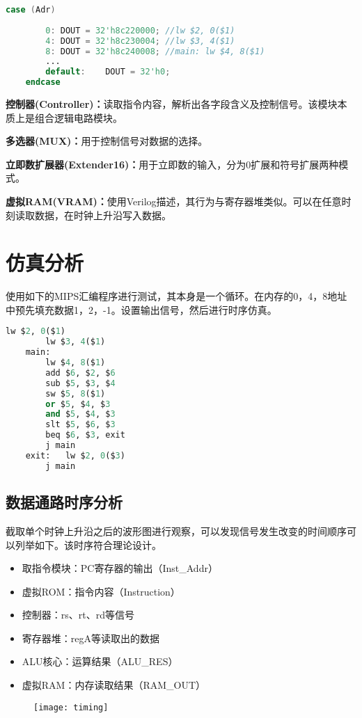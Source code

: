 \documentclass{hfutpaper}
\begin{document}
\begin{lstlisting}[language=verilog]
	case (Adr)
			
		0: DOUT = 32'h8c220000; //lw $2, 0($1)
		4: DOUT = 32'h8c230004; //lw $3, 4($1)
		8: DOUT = 32'h8c240008; //main: lw $4, 8($1)
		...
		default:	DOUT = 32'h0;
	endcase
\end{lstlisting}

\par \textbf{控制器(Controller)：}读取指令内容，解析出各字段含义及控制信号。该模块本质上是组合逻辑电路模块。
\par \textbf{多选器(MUX)：}用于控制信号对数据的选择。
\par \textbf{立即数扩展器(Extender16)：}用于立即数的输入，分为0扩展和符号扩展两种模式。
\par \textbf{虚拟RAM(VRAM)：}使用Verilog描述，其行为与寄存器堆类似。可以在任意时刻读取数据，在时钟上升沿写入数据。

\section{仿真分析}

\par 使用如下的MIPS汇编程序进行测试，其本身是一个循环。在内存的0，4，8地址中预先填充数据1，2，-1。设置输出信号，然后进行时序仿真。


\begin{lstlisting}[language=python]
		lw $2, 0($1)
		lw $3, 4($1)
	main:
		lw $4, 8($1)
		add $6, $2, $6
		sub $5, $3, $4
		sw $5, 8($1)
		or $5, $4, $3
		and $5, $4, $3
		slt $5, $6, $3
		beq $6, $3, exit
		j main
	exit:	lw $2, 0($3)
		j main
\end{lstlisting}

\subsection{数据通路时序分析}

\par 截取单个时钟上升沿之后的波形图进行观察，可以发现信号发生改变的时间顺序可以列举如下。该时序符合理论设计。

\begin{itemize}
	\item 取指令模块：PC寄存器的输出（Inst\_Addr）
	\item 虚拟ROM：指令内容（Instruction）
	\item 控制器：rs、rt、rd等信号
	\item 寄存器堆：regA等读取出的数据
	\item ALU核心：运算结果（ALU\_RES）
	\item 虚拟RAM：内存读取结果（RAM\_OUT）
\end{itemize} 
\begin{figure}[H]
	\centering
	\texttt{[image: timing]}
\end{figure}
\end{document}

